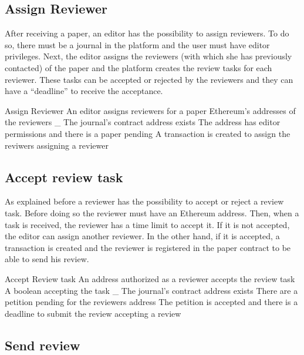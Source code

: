 \subsection*{Assign Reviewer}

After receiving a paper, an editor has the possibility to assign reviewers. To
do so, there must be a journal in the platform and the user must have editor
privileges. Next, the editor assigns the reviewers (with which she has
previously contacted) of the paper and the platform creates the review tasks for
each reviewer. These tasks can be accepted or rejected by the reviewers and they
can have a ``deadline'' to receive the acceptance.

{Assign Reviewer}%
{An editor assigns reviewers for a paper}%
{Ethereum's addresses of the reviewers}%
{_}%
{The journal's contract address exists} {The address has editor permissions and
  there is a paper pending}%
{A transaction is created to assign the reviwers}%
{assigning a reviewer}%

\subsection*{Accept review task}

As explained before a reviewer has the possibility to accept or reject a review
task. Before doing so the reviewer must have an Ethereum address. Then, when a
task is received, the reviewer has a time limit to accept it. If it is not
accepted, the editor can assign another reviewer. In the other hand, if it is
accepted, a transaction is created and the reviewer is registered in the paper
contract to be able to send his review.

{Accept Review task}%
{An address authorized as a reviewer accepts the review
  task}%
{A boolean accepting the task}%
{_}%
{The journal's contract address exists}%
{There are a petition pending for the reviewers address}%
{The petition is accepted and there is a deadline to submit the
  review}%
{accepting a review}%

\subsection*{Send review}

